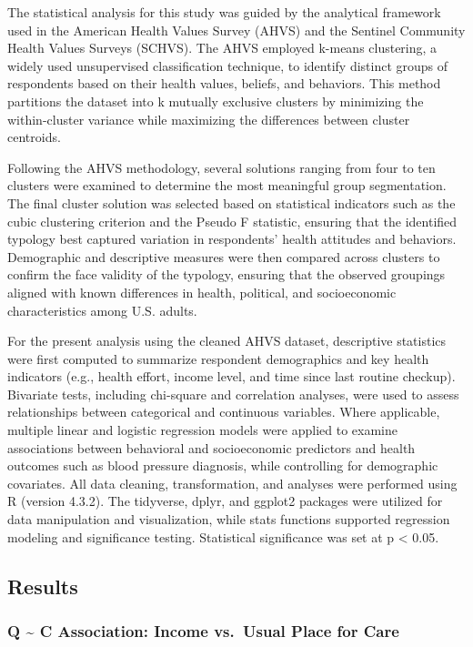 \documentclass[
  letterpaper,
  DIV=11,
  numbers=noendperiod]{scrartcl}
\begin{document}
The statistical analysis for this study was guided by the analytical
framework used in the American Health Values Survey (AHVS) and the
Sentinel Community Health Values Surveys (SCHVS). The AHVS employed
k-means clustering, a widely used unsupervised classification technique,
to identify distinct groups of respondents based on their health values,
beliefs, and behaviors. This method partitions the dataset into k
mutually exclusive clusters by minimizing the within-cluster variance
while maximizing the differences between cluster centroids.

Following the AHVS methodology, several solutions ranging from four to
ten clusters were examined to determine the most meaningful group
segmentation. The final cluster solution was selected based on
statistical indicators such as the cubic clustering criterion and the
Pseudo F statistic, ensuring that the identified typology best captured
variation in respondents' health attitudes and behaviors. Demographic
and descriptive measures were then compared across clusters to confirm
the face validity of the typology, ensuring that the observed groupings
aligned with known differences in health, political, and socioeconomic
characteristics among U.S. adults.

For the present analysis using the cleaned AHVS dataset, descriptive
statistics were first computed to summarize respondent demographics and
key health indicators (e.g., health effort, income level, and time since
last routine checkup). Bivariate tests, including chi-square and
correlation analyses, were used to assess relationships between
categorical and continuous variables. Where applicable, multiple linear
and logistic regression models were applied to examine associations
between behavioral and socioeconomic predictors and health outcomes such
as blood pressure diagnosis, while controlling for demographic
covariates. All data cleaning, transformation, and analyses were
performed using R (version 4.3.2). The tidyverse, dplyr, and ggplot2
packages were utilized for data manipulation and visualization, while
stats functions supported regression modeling and significance testing.
Statistical significance was set at p \textless{} 0.05.

\subsection{Results}\label{sec-results}

\subsubsection{Q \textasciitilde{} C Association: Income vs.~Usual Place
for Care}\label{q-c-association-income-vs.-usual-place-for-care}
\end{document}
